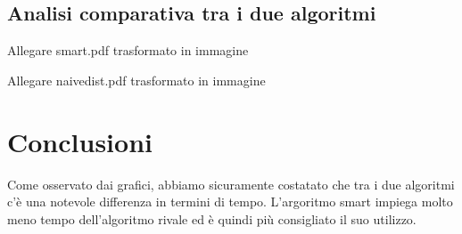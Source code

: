 \documentclass[a4paper]{article}
\begin{document}
\subsection{Analisi comparativa tra i due algoritmi}

Allegare smart.pdf trasformato in immagine

Allegare naivedist.pdf trasformato in immagine

\section{Conclusioni}

Come osservato dai grafici, abbiamo sicuramente costatato che tra i due algoritmi c’è una notevole differenza in termini di tempo. L’argoritmo smart impiega molto meno tempo dell'algoritmo rivale ed è quindi più consigliato il suo utilizzo.
\end{document}
